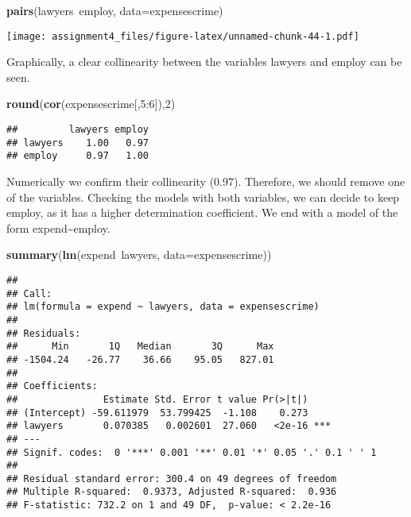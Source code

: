 \documentclass[11pt,]{article}
\newenvironment{Shaded}{\begin{snugshade}}{\end{snugshade}}
\newcommand{\KeywordTok}[1]{\textcolor[rgb]{0.13,0.29,0.53}{\textbf{{#1}}}}
\newcommand{\DataTypeTok}[1]{\textcolor[rgb]{0.13,0.29,0.53}{{#1}}}
\newcommand{\DecValTok}[1]{\textcolor[rgb]{0.00,0.00,0.81}{{#1}}}
\newcommand{\NormalTok}[1]{{#1}}
\begin{document}
\begin{Shaded}
\begin{Highlighting}[]
\KeywordTok{pairs}\NormalTok{(lawyers~employ, }\DataTypeTok{data=}\NormalTok{expensescrime)}
\end{Highlighting}
\end{Shaded}

\texttt{[image: assignment4\_files/figure-latex/unnamed-chunk-44-1.pdf]}

Graphically, a clear collinearity between the variables lawyers and
employ can be seen.

\begin{Shaded}
\begin{Highlighting}[]
\KeywordTok{round}\NormalTok{(}\KeywordTok{cor}\NormalTok{(expensescrime[,}\DecValTok{5}\NormalTok{:}\DecValTok{6}\NormalTok{]),}\DecValTok{2}\NormalTok{)}
\end{Highlighting}
\end{Shaded}

\begin{verbatim}
##         lawyers employ
## lawyers    1.00   0.97
## employ     0.97   1.00
\end{verbatim}

Numerically we confirm their collinearity (0.97). Therefore, we should
remove one of the variables. Checking the models with both variables, we
can decide to keep employ, as it has a higher determination coefficient.
We end with a model of the form expend\textasciitilde{}employ.

\begin{Shaded}
\begin{Highlighting}[]
\KeywordTok{summary}\NormalTok{(}\KeywordTok{lm}\NormalTok{(expend~lawyers, }\DataTypeTok{data=}\NormalTok{expensescrime))}
\end{Highlighting}
\end{Shaded}

\begin{verbatim}
## 
## Call:
## lm(formula = expend ~ lawyers, data = expensescrime)
## 
## Residuals:
##      Min       1Q   Median       3Q      Max 
## -1504.24   -26.77    36.66    95.05   827.01 
## 
## Coefficients:
##               Estimate Std. Error t value Pr(>|t|)    
## (Intercept) -59.611979  53.799425  -1.108    0.273    
## lawyers       0.070385   0.002601  27.060   <2e-16 ***
## ---
## Signif. codes:  0 '***' 0.001 '**' 0.01 '*' 0.05 '.' 0.1 ' ' 1
## 
## Residual standard error: 300.4 on 49 degrees of freedom
## Multiple R-squared:  0.9373, Adjusted R-squared:  0.936 
## F-statistic: 732.2 on 1 and 49 DF,  p-value: < 2.2e-16
\end{verbatim}
\end{document}
